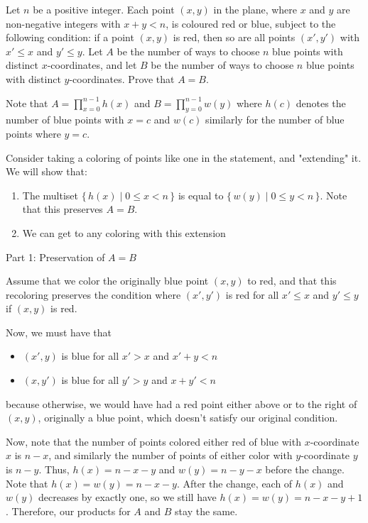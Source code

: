 
\begin{problem}[ISL 2002 C1]
    Let $n$ be a positive integer. Each point $(x,y)$ in the plane, where $x$ and $y$ are non-negative integers with $x+y<n$, is coloured red or blue, subject to the following condition: if a point $(x,y)$ is red, then so are all points $(x',y')$ with $x'\leq x$ and $y'\leq y$. Let $A$ be the number of ways to choose $n$ blue points with distinct $x$-coordinates, and let $B$ be the number of ways to choose $n$ blue points with distinct $y$-coordinates. Prove that $A=B$.
\end{problem}

\begin{solution}
    Note that $\displaystyle{A=\prod_{x=0}^{n-1}h(x)}$ and $\displaystyle{B=\prod_{y=0}^{n-1}w(y)}$ where $h(c)$ denotes the number of blue points with $x=c$ and $w(c)$ similarly for the number of blue points where $y=c$.
    
    Consider taking a coloring of points like one in the statement, and "extending" it. We will show that:
    
    \begin{enumerate}
      \item The multiset $\{\,h(x) \mid 0\leq x<n\,\}$ is equal to $\{\,w(y) \mid 0\leq y<n\,\}$. Note that this preserves $A=B$.
      \item We can get to any coloring with this extension
    \end{enumerate}
    
    \large Part 1: Preservation of $A=B$ \small
    
    Assume that we color the originally blue point $(x,y)$ to red, and that this recoloring preserves the condition where $(x',y')$ is red for all $x'\leq x$ and $y'\leq y$ if $(x,y)$ is red.
    
    Now, we must have that
    
    \begin{itemize}
      \item $(x',y)$ is blue for all $x'>x$ and $x'+y<n$
      \item $(x,y')$ is blue for all $y'>y$ and $x+y'<n$
    \end{itemize}
    
    because otherwise, we would have had a red point either above or to the right of $(x,y)$, originally a blue point, which doesn't satisfy our original condition.
    
    Now, note that the number of points colored either red of blue with $x$-coordinate $x$ is $n-x$, and similarly the number of points of either color with $y$-coordinate $y$ is $n-y$. Thus, $h(x) = n-x-y$ and $w(y) = n-y-x$ before the change. Note that $h(x)=w(y)=n-x-y$. After the change, each of $h(x)$ and $w(y)$ decreases by exactly one, so we still have $h(x)=w(y)=n-x-y+1$. Therefore, our products for $A$ and $B$ stay the same.
    

\end{solution}
